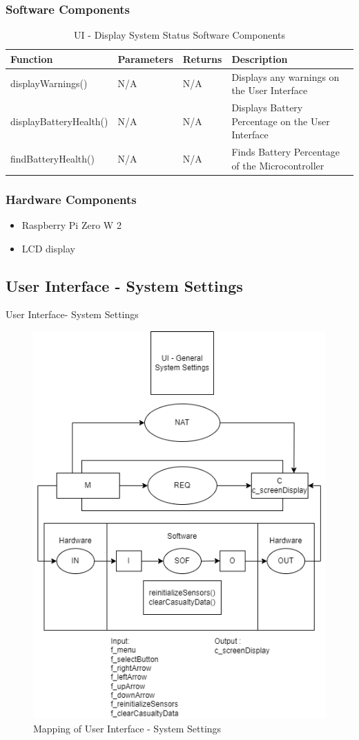 \documentclass{article}
\newcounter{mnum}
\newcommand{\mthemnum}{M\themnum}
\begin{document}
\begin{description}
        \subsubsection{Software Components}
                \begin{longtable}{|l|l|l|l|}
                \caption{UI - Display System Status Software Components}
                \hline
                \textbf{Function} & \textbf{Parameters} & \textbf {Returns} & \textbf{Description} \\
                \endhead
                \hline
                displayWarnings()   & N/A & N/A  & Displays any warnings on the User Interface \\
                \hline
                displayBatteryHealth()   & N/A & N/A & Displays Battery Percentage on the User Interface \\
                \hline
                findBatteryHealth()   & N/A & N/A & Finds Battery Percentage of the Microcontroller \\
                \hline
                \end{longtable}
        \subsubsection{Hardware Components}
            \begin{itemize}
            \item Raspberry Pi Zero W 2
            \item LCD display
            \end{itemize}        
    \newpage
    
    \subsection{User Interface - System Settings}
    \item [\refstepcounter{mnum} \mthemnum \label{UI_SS}:] User Interface- System Settings
    
    \begin{figure}[!htb]
    	\centering
    	\includegraphics[width=0.5\linewidth]{mccharts-Copy of UI - SystemSettings.drawio.png}
    	\caption{Mapping of User Interface - System Settings}
    \end{figure}
    

\end{description}
\end{document}
